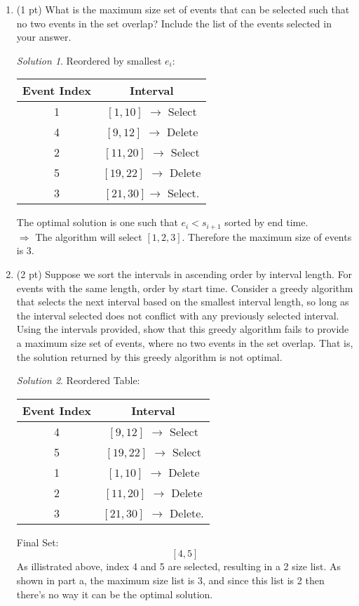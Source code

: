\documentclass[12pt]{article}
\theoremstyle{remark}
\newtheorem*{solution}{Solution}
\begin{document}
\begin{enumerate}
\begin{enumerate}[label=(\alph*)]
\item (1 pt) What is the maximum size set of events that can be selected such that no two events in the set overlap? Include the list of the events selected in your answer. \\
\begin{solution}
Reordered by smallest $e_i$:
\begin{center}
\begin{tabular}{c|c}
Event Index & Interval \\ \hline
1 & $[1, 10]$ $\rightarrow$ Select\\
4 & $[9, 12]$ $\rightarrow$ Delete\\
2 & $[11, 20]$ $\rightarrow$ Select\\
5 & $[19, 22]$ $\rightarrow$ Delete\\
3 & $[21, 30]$$\rightarrow$ Select.
\end{tabular}
\end{center}
The optimal solution is one such that $e_i < s_{i+1}$ sorted by end time. \\ $\Rightarrow$ The algorithm will select $[1,2,3]$. Therefore the maximum size of events is 3. 
\end{solution}

\newpage
\item (2 pt) Suppose we sort the intervals in ascending order by interval length. For events with the same length, order by start time. Consider a greedy algorithm that selects the next interval based on the smallest interval length, so long as the interval selected does not conflict with any previously selected interval. Using the intervals provided, show that this greedy algorithm fails to provide a maximum size set of events, where no two events in the set overlap. That is, the solution returned by this greedy algorithm is not optimal.\\

\begin{solution}
Reordered Table:
\begin{center}
\begin{tabular}{c|c}
Event Index & Interval \\ \hline
4 & $[9, 12]$ $\rightarrow$ Select\\ 
5 & $[19, 22]$ $\rightarrow$ Select\\
1 & $[1, 10]$ $\rightarrow$ Delete\\
2 & $[11, 20]$ $\rightarrow$ Delete\\
3 & $[21, 30]$ $\rightarrow$ Delete.
\end{tabular}
\end{center}
Final Set: $$[4,5]$$
As illistrated above, index 4 and 5 are selected, resulting in a 2 size list. As shown in part a, the maximum size list is 3, and since this list is 2 then there's no way it can be the optimal solution.
\end{solution}


\end{enumerate}
\end{enumerate}
\end{document}
